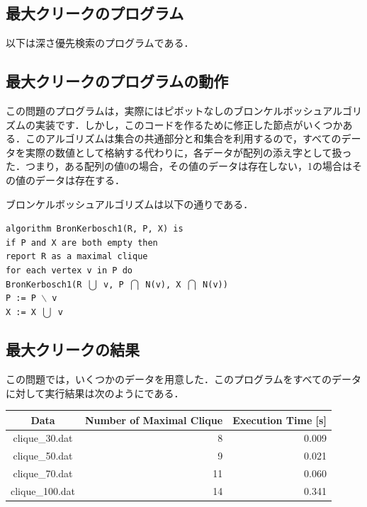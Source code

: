 \documentclass[a4j, titlepage]{jarticle}
\begin{document}
    \subsection{最大クリークのプログラム}
    以下は深さ優先検索のプログラムである．
     
        
    \subsection{最大クリークのプログラムの動作}
    この問題のプログラムは，実際にはピボットなしのブロンケルボッシュアルゴリズムの実装です．しかし，このコードを作るために修正した節点がいくつかある．このアルゴリズムは集合の共通部分と和集合を利用するので，すべてのデータを実際の数値として格納する代わりに，各データが配列の添え字として扱った．つまり，ある配列の値0の場合，その値のデータは存在しない，1の場合はその値のデータは存在する．

    ブロンケルボッシュアルゴリズムは以下の通りである．
    \begin{shadebox}
        \texttt{algorithm BronKerbosch1(R, P, X) is \\
        \hspace{10pt} if P and X are both empty then \\
        \hspace{30pt} report R as a maximal clique \\
        \hspace{10pt} for each vertex v in P do \\
        \hspace{30pt} BronKerbosch1(R $\bigcup$ {v}, P $\bigcap$ N(v), X $\bigcap$ N(v)) \\
        \hspace{30pt} P := P $\backslash$ {v} \\
        \hspace{30pt} X := X $\bigcup$ {v}
        }
    \end{shadebox}
   
    
    \subsection{最大クリークの結果}
    この問題では，いくつかのデータを用意した．このプログラムをすべてのデータに対して実行結果は次のようにである． %
    \begin{longtable}[c]{|c|r|r|}
        \hline
        \rowcolor[HTML]{C0C0C0} 
        \cellcolor[HTML]{C0C0C0}Data & \multicolumn{1}{c|}{\cellcolor[HTML]{C0C0C0}Number of Maximal Clique} & \multicolumn{1}{c|}{\cellcolor[HTML]{C0C0C0}Execution Time [s]} \\ \hline
        \endfirsthead
        \endhead
        clique\_30.dat   & 8       & 0.009       \\ \hline
        clique\_50.dat   & 9       & 0.021       \\ \hline
        clique\_70.dat   & 11      & 0.060   \\ \hline
        clique\_100.dat  & 14     & 0.341       \\ \hline
    \end{longtable}
    
\end{document}
